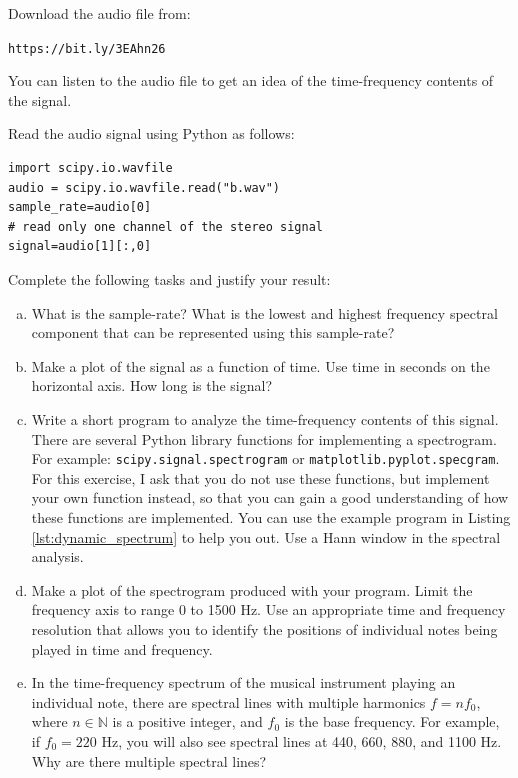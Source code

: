 \begin{enumerate}
Download the audio file from:
\begin{center}
\verb|https://bit.ly/3EAhn26| 
\end{center}
You can listen to the audio file to get an idea of the time-frequency
contents of the signal.

Read the audio signal using Python as follows:
\begin{verbatim}
import scipy.io.wavfile
audio = scipy.io.wavfile.read("b.wav")
sample_rate=audio[0]
# read only one channel of the stereo signal
signal=audio[1][:,0]
\end{verbatim}

Complete the following tasks and justify your result:
\begin{enumerate}[a)]

\item What is the sample-rate? What is the lowest and highest
  frequency spectral component that can be represented using this
  sample-rate? 

\item Make a plot of the signal as a function of time. Use time in
  seconds on the horizontal axis. How long is the signal?
    
\item Write a short program to analyze the time-frequency contents of
  this signal. There are several Python library functions for
  implementing a spectrogram. For example:
  \verb|scipy.signal.spectrogram| or
  \verb|matplotlib.pyplot.specgram|. For this exercise, I ask that you
  do not use these functions, but implement your own function instead,
  so that you can gain a good understanding of how these functions are
  implemented. You can use the example program in Listing
  \ref{lst:dynamic_spectrum} to help you out. Use a Hann window in the
  spectral analysis.

\item Make a plot of the spectrogram produced with your program. Limit
  the frequency axis to range 0 to 1500 Hz. Use an appropriate time
  and frequency resolution that allows you to identify the positions
  of individual notes being played in time and frequency.

\item In the time-frequency spectrum of the musical instrument playing
  an individual note, there are spectral lines with multiple harmonics
  $f = n f_0$, where $n \in \mathbb{N}$ is a positive integer, and
  $f_0$ is the base frequency. For example, if $f_0= 220$ Hz, you will
  also see spectral lines at 440, 660, 880, and 1100 Hz. Why are there
  multiple spectral lines?


\end{enumerate}
\end{enumerate}
